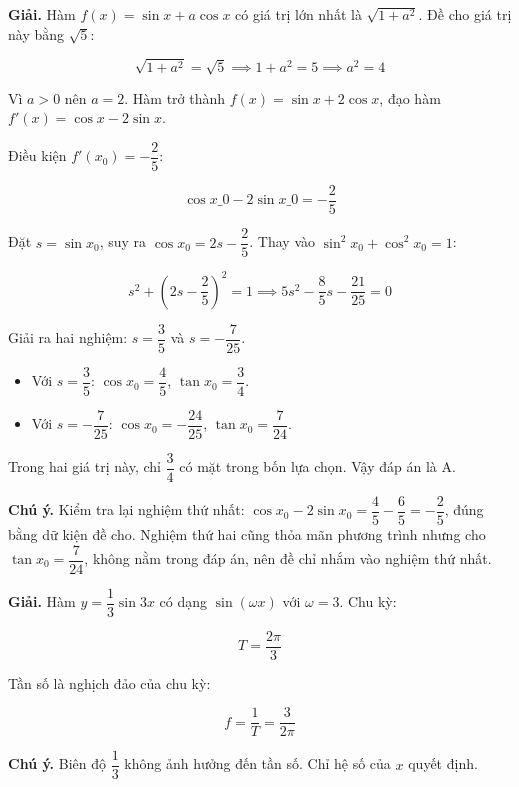 \documentclass[11pt, a4paper]{article}
\begin{document}
\begin{dapan}[11 — Đáp án A]
\textbf{Giải.} Hàm $f(x) = \sin x + a\cos x$ có giá trị lớn nhất là $\sqrt{1+a^2}$. Đề cho giá trị này bằng $\sqrt{5}$:

$$\sqrt{1+a^2} = \sqrt{5} \implies 1+a^2 = 5 \implies a^2 = 4$$

Vì $a > 0$ nên $a = 2$. Hàm trở thành $f(x) = \sin x + 2\cos x$, đạo hàm $f'(x) = \cos x - 2\sin x$.

Điều kiện $f'(x_0) = -\dfrac{2}{5}$:

$$\cos x\_0 - 2\sin x\_0 = -\frac{2}{5}$$

Đặt $s = \sin x_0$, suy ra $\cos x_0 = 2s - \dfrac{2}{5}$. Thay vào $\sin^2 x_0 + \cos^2 x_0 = 1$:

$$s^2 + \left(2s - \frac{2}{5}\right)^2 = 1 \implies 5s^2 - \frac{8}{5}s - \frac{21}{25} = 0$$

Giải ra hai nghiệm: $s = \dfrac{3}{5}$ và $s = -\dfrac{7}{25}$.

\begin{itemize}[leftmargin=1.4em, itemsep=2pt]
\item Với $s = \dfrac{3}{5}$: $\cos x_0 = \dfrac{4}{5}$, $\tan x_0 = \dfrac{3}{4}$.
\item Với $s = -\dfrac{7}{25}$: $\cos x_0 = -\dfrac{24}{25}$, $\tan x_0 = \dfrac{7}{24}$.
\end{itemize}


Trong hai giá trị này, chỉ $\dfrac{3}{4}$ có mặt trong bốn lựa chọn. Vậy đáp án là A.

\textbf{Chú ý.} Kiểm tra lại nghiệm thứ nhất: $\cos x_0 - 2\sin x_0 = \dfrac{4}{5} - \dfrac{6}{5} = -\dfrac{2}{5}$, đúng bằng dữ kiện đề cho. Nghiệm thứ hai cũng thỏa mãn phương trình nhưng cho $\tan x_0 = \dfrac{7}{24}$, không nằm trong đáp án, nên đề chỉ nhắm vào nghiệm thứ nhất.
\end{dapan}

\begin{dapan}[12 — Đáp án C]
\textbf{Giải.} Hàm $y = \dfrac{1}{3}\sin 3x$ có dạng $\sin(\omega x)$ với $\omega = 3$. Chu kỳ:

$$T = \frac{2\pi}{3}$$

Tần số là nghịch đảo của chu kỳ:

$$f = \frac{1}{T} = \frac{3}{2\pi}$$

\textbf{Chú ý.} Biên độ $\dfrac{1}{3}$ không ảnh hưởng đến tần số. Chỉ hệ số của $x$ quyết định.
\end{dapan}
\end{document}
